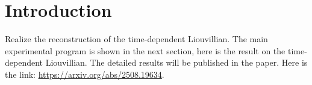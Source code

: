 \documentclass{article}
\begin{document}

\section{Introduction}
Realize the reconstruction of the time-dependent Liouvillian. The main experimental program is shown in the next section, here is the result on the time-dependent Liouvillian. The detailed results will be published in the paper. Here is the link: \url{https://arxiv.org/abs/2508.19634}.   
\end{document}
